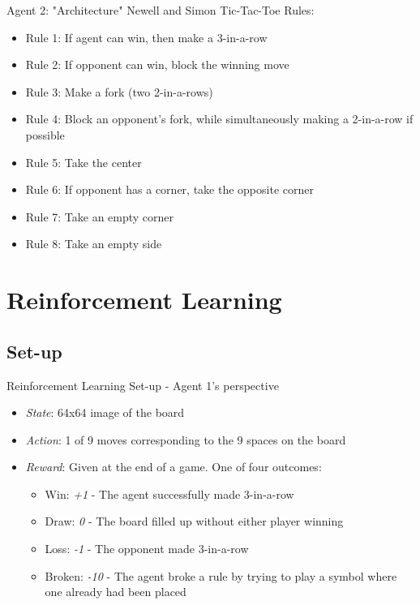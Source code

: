 \documentclass[11pt]{beamer}
\begin{document}
\begin{frame}{Agent 2: "Architecture"}
	Newell and Simon Tic-Tac-Toe Rules:
	\begin{itemize}
		\item Rule 1: If agent can win, then make a 3-in-a-row
		\item Rule 2: If opponent can win, block the winning move
		\item Rule 3: Make a fork (two 2-in-a-rows)
		\item Rule 4: Block an opponent's fork, while simultaneously making a 2-in-a-row if possible
		\item Rule 5: Take the center
		\item Rule 6: If opponent has a corner, take the opposite corner
		\item Rule 7: Take an empty corner
		\item Rule 8: Take an empty side
	\end{itemize}		
\end{frame}



\section{Reinforcement Learning}

\subsection{Set-up}
\begin{frame}{Reinforcement Learning Set-up - Agent 1's perspective}
	\begin{itemize}
		\item {\it State}: 64x64 image of the board
		\item {\it Action}: 1 of 9 moves corresponding to the 9 spaces on the board
		\item {\it Reward}: Given at the end of a game. One of four outcomes:
		\begin{itemize}
			\item Win: {\it +1} - The agent successfully made 3-in-a-row 
			\item Draw: {\it 0} - The board filled up without either player winning
			\item Loss: {\it -1} - The opponent made 3-in-a-row
			\item Broken: {\it -10} - The agent broke a rule by trying to play a symbol where one already had been placed
		\end{itemize}
	\end{itemize}
\end{frame}
\end{document}
